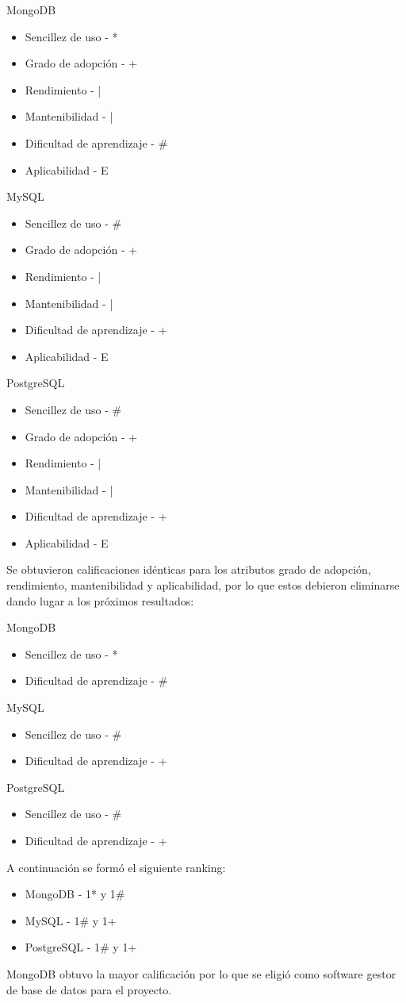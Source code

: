 \documentclass[twoside]{article}
\begin{document}
MongoDB
\begin{itemize}
    \item Sencillez de uso - *
    \item Grado de adopción - +
    \item Rendimiento - |
    \item Mantenibilidad - |
    \item Dificultad de aprendizaje - \#
    \item Aplicabilidad - E
\end{itemize}
MySQL
\begin{itemize}
    \item Sencillez de uso - \#
    \item Grado de adopción - +
    \item Rendimiento - |
    \item Mantenibilidad - |
    \item Dificultad de aprendizaje - +
    \item Aplicabilidad - E
\end{itemize}
PostgreSQL
\begin{itemize}
    \item Sencillez de uso - \#
    \item Grado de adopción - +
    \item Rendimiento - |
    \item Mantenibilidad - |
    \item Dificultad de aprendizaje - +
    \item Aplicabilidad - E
\end{itemize}
Se obtuvieron calificaciones idénticas para los atributos grado de adopción, rendimiento, mantenibilidad y aplicabilidad, por lo que estos debieron eliminarse dando lugar a los próximos resultados:

MongoDB
\begin{itemize}
    \item Sencillez de uso - *
    \item Dificultad de aprendizaje - \#
\end{itemize}
MySQL
\begin{itemize}
    \item Sencillez de uso - \#
    \item Dificultad de aprendizaje - +
\end{itemize}
PostgreSQL
\begin{itemize}
    \item Sencillez de uso - \#
    \item Dificultad de aprendizaje - +
\end{itemize}
A continuación se formó el siguiente ranking:
\begin{itemize}
    \item MongoDB - 1* y 1\#
    \item MySQL - 1\# y 1+
    \item PostgreSQL - 1\# y 1+
\end{itemize}
MongoDB obtuvo la mayor calificación por lo que se eligió como software gestor de base de datos para el proyecto.
\end{document}
